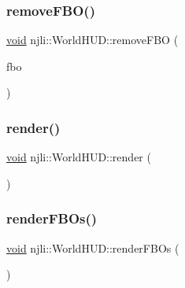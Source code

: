 \subsubsection{\texorpdfstring{remove\+F\+B\+O()}{removeFBO()}}
{\footnotesize\ttfamily \mbox{\hyperlink{_thread_8h_af1e856da2e658414cb2456cb6f7ebc66}{void}} njli\+::\+World\+H\+U\+D\+::remove\+F\+BO (\begin{DoxyParamCaption}\item[{\mbox{\hyperlink{classnjli_1_1_abstract_frame_buffer_object}{Abstract\+Frame\+Buffer\+Object}} $\ast$}]{fbo }\end{DoxyParamCaption})\hspace{0.3cm}{\ttfamily [protected]}}

\mbox{\label{classnjli_1_1_world_h_u_d_a71d1e7e224fd723fae0bb65cbdd235c9}} 
\subsubsection{\texorpdfstring{render()}{render()}}
{\footnotesize\ttfamily \mbox{\hyperlink{_thread_8h_af1e856da2e658414cb2456cb6f7ebc66}{void}} njli\+::\+World\+H\+U\+D\+::render (\begin{DoxyParamCaption}{ }\end{DoxyParamCaption})\hspace{0.3cm}{\ttfamily [protected]}}

\mbox{\label{classnjli_1_1_world_h_u_d_a93c0a1a56854f78c78fc1f3bfb5d91e0}} 
\subsubsection{\texorpdfstring{render\+F\+B\+Os()}{renderFBOs()}}
{\footnotesize\ttfamily \mbox{\hyperlink{_thread_8h_af1e856da2e658414cb2456cb6f7ebc66}{void}} njli\+::\+World\+H\+U\+D\+::render\+F\+B\+Os (\begin{DoxyParamCaption}{ }\end{DoxyParamCaption})\hspace{0.3cm}{\ttfamily [protected]}}

\mbox{\label{classnjli_1_1_world_h_u_d_a53e9e3898ebb81ba221c710380b554c0}} 
